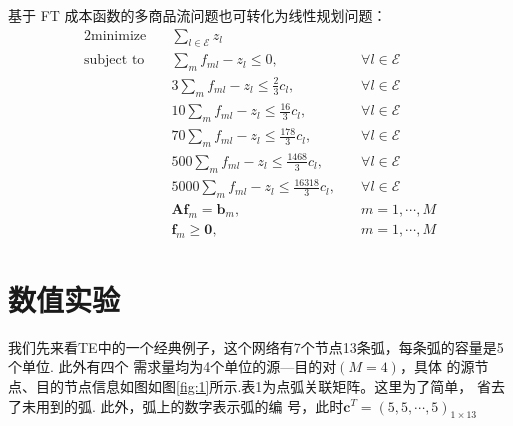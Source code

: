\documentclass[UTF8]{ctexart}
\begin{document}
基于 FT 成本函数的多商品流问题也可转化为线性规划问题：
\begin{alignat}{2}
\mbox{minimize}\quad &\sum_{l \in \mathcal{E}}z_l&{}\nonumber\\
\mbox{subject to}\quad &
\sum_{m} f_{ml}-z_l\leq 0,\quad&\forall l\in \mathcal{E} \nonumber\\
&3\sum_{m} f_{ml}-z_l\leq \frac{2}{3}c_{l},\quad&\forall l\in \mathcal{E} \nonumber\\
&10\sum_{m} f_{ml}-z_l\leq \frac{16}{3}c_{l},\quad&\forall l\in \mathcal{E} \nonumber\\
&70\sum_{m} f_{ml}-z_l\leq \frac{178}{3}c_{l},\quad&\forall l\in \mathcal{E} \nonumber\\
&500\sum_{m} f_{ml}-z_l\leq \frac{1468}{3}c_{l},\quad&\forall l\in \mathcal{E} \nonumber\\
&5000\sum_{m} f_{ml}-z_l\leq \frac{16318}{3}c_{l},\quad&\forall l\in \mathcal{E} \nonumber\\
&\bm{A}\bm{f}_m=\bm{b}_m,\quad &m=1,\cdots,M\nonumber\\
&\bm{f}_m \geq \bm{0},&m=1,\cdots,M
\end{alignat}

\newpage
\section{数值实验}
我们先来看TE中的一个经典例子，这个网络有7个节点13条弧，每条弧的容量是5个单位. 此外有四个
需求量均为4个单位的源—目的对$(M =4)$，具体
的源节点、目的节点信息如图如图\ref{fig:1}所示.表1为点弧关联矩阵。这里为了简单，
省去了未用到的弧. 此外，弧上的数字表示弧的编
号，此时$\bm{c}^T=(5,5,\cdots,5)_{1\times 13}$
\end{document}
